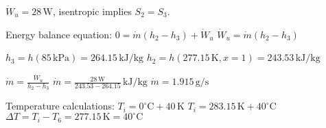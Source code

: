 \( \dot{W}_u = 28 \, \text{W} \), isentropic implies \( S_2 = S_3 \).  

Energy balance equation:  
\( 0 = \dot{m} (h_2 - h_3) + \dot{W}_u \)  
\( \dot{W}_u = \dot{m} (h_2 - h_3) \)  

\( h_3 = h(85 \, \text{kPa}) = 264.15 \, \text{kJ/kg} \)  
\( h_2 = h(277.15 \, \text{K}, x = 1) = 243.53 \, \text{kJ/kg} \)  

\( \dot{m} = \frac{\dot{W}_u}{h_2 - h_3} \)  
\( \dot{m} = \frac{28 \, \text{W}}{243.53 - 264.15} \, \text{kJ/kg} \)  
\( \dot{m} = 1.915 \, \text{g/s} \)  

Temperature calculations:  
\( T_i = 0^\circ \text{C} + 40 \, \text{K} \)  
\( T_i = 283.15 \, \text{K} + 40^\circ \text{C} \)  
\( \Delta T = T_i - T_6 = 277.15 \, \text{K} = 40^\circ \text{C} \)